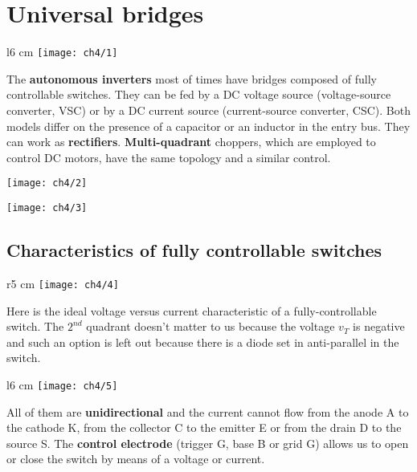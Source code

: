 

\chapter{Universal bridges}
	\begin{wrapfigure}[5]{l}{6 cm}
	\vspace{-5mm}
	\texttt{[image: ch4/1]}
	\end{wrapfigure}
	The \textbf{autonomous inverters} most of times have bridges composed of fully controllable switches. They can be fed by a DC voltage source (voltage-source converter, VSC) or by a DC current source (current-source converter, CSC). Both models differ on the presence of a capacitor or an inductor in the entry bus. They can work as \textbf{rectifiers}. \textbf{Multi-quadrant} choppers, which are employed to control DC motors, have the same topology and a similar control. 
	
	\begin{minipage}{0.5\textwidth}
		\texttt{[image: ch4/2]}
	\end{minipage}
	\begin{minipage}{0.5\textwidth}
		\vspace{3mm}
		\texttt{[image: ch4/3]}	
	\end{minipage}
	
\section{Characteristics of fully controllable switches}
	\begin{wrapfigure}[4]{r}{5 cm}
	\vspace{-5mm}
	\texttt{[image: ch4/4]}
	\end{wrapfigure}
	Here is the ideal voltage versus current characteristic of a fully-controllable switch. The $2^{nd}$ quadrant doesn't matter to us because the voltage $v_T$ is negative and such an option is left out because there is a diode set in anti-parallel in the switch. \\
	
	\begin{wrapfigure}[6]{l}{6 cm}
	\vspace{-5mm}
	\texttt{[image: ch4/5]}
	\end{wrapfigure}
	All of them are \textbf{unidirectional} and the current cannot flow from the anode A to the cathode K, from the collector C to the emitter E or from the drain D to the source S. The \textbf{control electrode} (trigger G, base B or grid G) allows us to open or close the switch by means of a voltage or current. 
	
